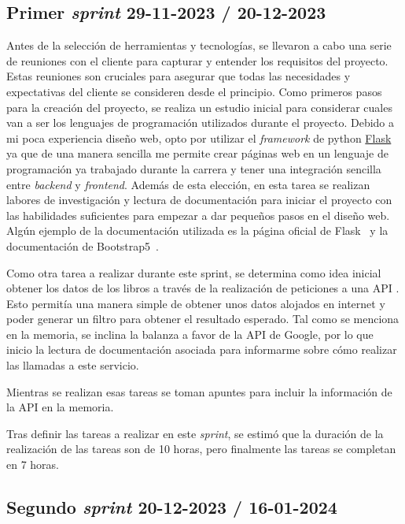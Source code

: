 \subsection{Primer \textit{sprint} 29-11-2023 / 20-12-2023}
Antes de la selección de herramientas y tecnologías, se llevaron a cabo una serie de reuniones con el cliente para capturar y entender los requisitos del proyecto. Estas reuniones son cruciales para asegurar que todas las necesidades y expectativas del cliente se consideren desde el principio.
Como primeros pasos para la creación del proyecto, se realiza un estudio inicial para considerar cuales van a ser los lenguajes de programación utilizados durante el proyecto. Debido a mi poca experiencia diseño web, opto por utilizar el \textit{framework} de python \href{https://flask.palletsprojects.com/en/3.0.x/}{Flask} ya que de una manera sencilla me permite crear páginas web en un lenguaje de programación ya trabajado durante la carrera y tener una integración sencilla entre \textit{backend} y \textit{frontend}. Además de esta elección, en esta tarea se realizan labores de investigación y lectura de documentación para iniciar el proyecto con las habilidades suficientes para empezar a dar pequeños pasos en el diseño web.
Algún ejemplo de la documentación utilizada es la página oficial de Flask~\cite{Flask} y la documentación de Bootstrap5~\cite{Bootstrap5}.

Como otra tarea a realizar durante este sprint, se determina como idea inicial obtener los datos de los libros a través de la realización de peticiones a una API . Esto permitía una manera simple de obtener unos datos alojados en internet y poder generar un filtro  para obtener el resultado esperado.
Tal como se menciona en la memoria, se inclina la balanza a favor de la API de Google, por lo que inicio la lectura de documentación asociada para informarme sobre cómo realizar las llamadas a este servicio.

Mientras se realizan esas tareas se toman apuntes para incluir la información de la API en la memoria.

Tras definir las tareas a realizar en este \textit{sprint}, se estimó que la duración de la realización de las tareas son de 10 horas, pero finalmente las tareas se completan en 7 horas.

\subsection{Segundo \textit{sprint} 20-12-2023 / 16-01-2024}

